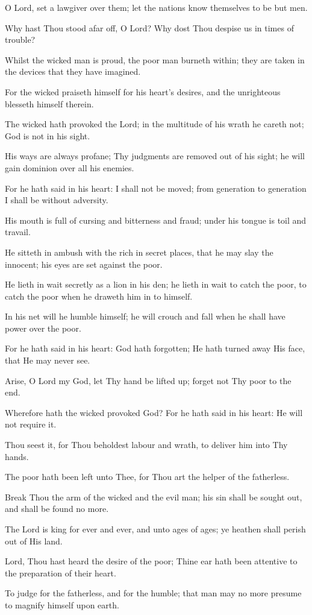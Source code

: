 O Lord, set a lawgiver over them; let the nations know themselves to be but men.

Why hast Thou stood afar off, O Lord? Why dost Thou despise us in times of trouble?

Whilst the wicked man is proud, the poor man burneth within; they are taken in the devices that they have imagined.

For the wicked praiseth himself for his heart’s desires, and the unrighteous blesseth himself therein.

The wicked hath provoked the Lord; in the multitude of his wrath he careth not; God is not in his sight.

His ways are always profane; Thy judgments are removed out of his sight; he will gain dominion over all his enemies.

For he hath said in his heart: I shall not be moved; from generation to generation I shall be without adversity.

His mouth is full of cursing and bitterness and fraud; under his tongue is toil and travail.

He sitteth in ambush with the rich in secret places, that he may slay the innocent; his eyes are set against the poor.

He lieth in wait secretly as a lion in his den; he lieth in wait to catch the poor, to catch the poor when he draweth him in to himself.

In his net will he humble himself; he will crouch and fall when he shall have power over the poor.

For he hath said in his heart: God hath forgotten; He hath turned away His face, that He may never see.

Arise, O Lord my God, let Thy hand be lifted up; forget not Thy poor to the end.

Wherefore hath the wicked provoked God? For he hath said in his heart: He will not require it.

Thou seest it, for Thou beholdest labour and wrath, to deliver him into Thy hands.

The poor hath been left unto Thee, for Thou art the helper of the fatherless.

Break Thou the arm of the wicked and the evil man; his sin shall be sought out, and shall be found no more.

The Lord is king for ever and ever, and unto ages of ages; ye heathen shall perish out of His land.

Lord, Thou hast heard the desire of the poor; Thine ear hath been attentive to the preparation of their heart.

To judge for the fatherless, and for the humble; that man may no more presume to magnify himself upon earth.
